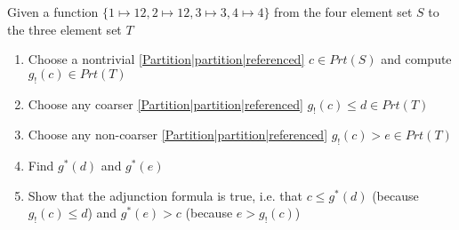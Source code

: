 

Given a function $\{1 \mapsto 12, 2 \mapsto 12, 3 \mapsto 3, 4 \mapsto 4\}$ from the four element set $S$ to the three element set $T$
    \begin{enumerate}
      \item Choose a nontrivial \ref{Partition|partition|referenced} $c \in Prt(S)$ and compute $g_!(c) \in Prt(T)$
      \item Choose any coarser \ref{Partition|partition|referenced} $g_!(c)\leq d \in Prt(T)$
      \item Choose any non-coarser \ref{Partition|partition|referenced} $g_!(c) > e \in Prt(T)$
      \item Find $g^*(d)$ and $g^*(e)$
      \item Show that the adjunction formula is true, i.e. that $c \leq g^*(d)$ (because $g_!(c) \leq d$) and $g^*(e) > c$ (because $e > g_!(c)$)
    \end{enumerate}